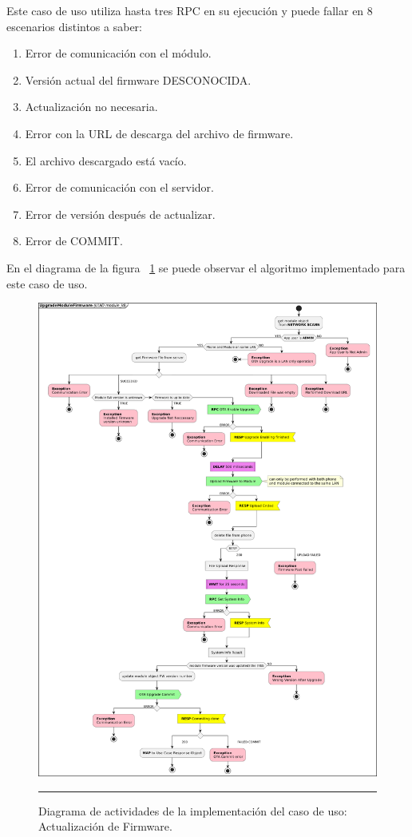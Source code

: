 Este caso de uso utiliza hasta tres RPC en su ejecución y puede fallar en 8 escenarios distintos a saber:

\begin{enumerate}
	\item Error de comunicación con el módulo.
	\item Versión actual del firmware DESCONOCIDA.
	\item Actualización no necesaria.
	\item Error con la URL de descarga del archivo de firmware.
	\item El archivo descargado está vacío.
	\item Error de comunicación con el servidor.
	\item Error de versión después de actualizar.
	\item Error de COMMIT.
\end{enumerate} 

En el diagrama de la figura ~\ref{fig:act_ota} se puede observar el algoritmo implementado para este caso de uso.

\begin{figure}[htbp]
	\centering
	\includegraphics[width=\textwidth]{Figures/iter3/ACT_ota_ink.png}
	\rule{35em}{1pt}
	\caption[Actividades OTA]{Diagrama de actividades de la implementación del caso de uso: Actualización de Firmware.}
	\label{fig:act_ota}
\end{figure}

